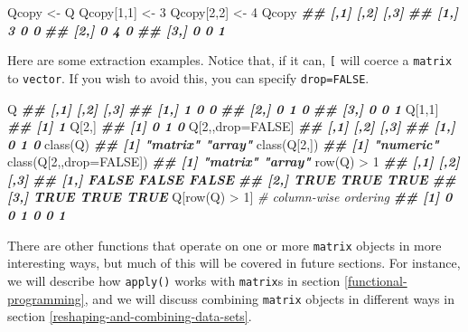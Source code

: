 \documentclass[
  12pt,
  krantz2]{krantz}
\makeatletter
\newenvironment{Shaded}{\begin{snugshade}}{\end{snugshade}}
\newcommand{\AttributeTok}[1]{\textcolor[rgb]{0.61,0.61,0.61}{#1}}
\newcommand{\CommentTok}[1]{\textcolor[rgb]{0.37,0.37,0.37}{\textit{#1}}}
\newcommand{\ConstantTok}[1]{\textcolor[rgb]{0,0,0}{#1}}
\newcommand{\DecValTok}[1]{\textcolor[rgb]{0.06,0.06,0.06}{#1}}
\newcommand{\DocumentationTok}[1]{\textcolor[rgb]{0.37,0.37,0.37}{\textbf{\textit{#1}}}}
\newcommand{\FunctionTok}[1]{\textcolor[rgb]{0,0,0}{#1}}
\newcommand{\NormalTok}[1]{#1}
\newcommand{\OtherTok}[1]{\textcolor[rgb]{0.37,0.37,0.37}{#1}}
\newcommand{\SpecialCharTok}[1]{\textcolor[rgb]{0,0,0}{#1}}
\newenvironment{kframe}{%
\medskip{}
\setlength{\fboxsep}{.8em}
 \def\at@end@of@kframe{}%
 \ifinner\ifhmode%
  \def\at@end@of@kframe{\end{minipage}}%
  \begin{minipage}{\columnwidth}%
 \fi\fi%
 \def\FrameCommand##1{\hskip\@totalleftmargin \hskip-\fboxsep
 \colorbox{shadecolor}{##1}\hskip-\fboxsep
     \hskip-\linewidth \hskip-\@totalleftmargin \hskip\columnwidth}%
 \MakeFramed {\advance\hsize-\width
   \@totalleftmargin\z@ \linewidth\hsize
   \@setminipage}}%
 {\par\unskip\endMakeFramed%
 \at@end@of@kframe}
\renewenvironment{Shaded}{\begin{kframe}}{\end{kframe}}
\makeatother
\begin{document}
\begin{Shaded}
\begin{Highlighting}[]
\NormalTok{Qcopy }\OtherTok{\textless{}{-}}\NormalTok{ Q}
\NormalTok{Qcopy[}\DecValTok{1}\NormalTok{,}\DecValTok{1}\NormalTok{] }\OtherTok{\textless{}{-}} \DecValTok{3}
\NormalTok{Qcopy[}\DecValTok{2}\NormalTok{,}\DecValTok{2}\NormalTok{] }\OtherTok{\textless{}{-}} \DecValTok{4}
\NormalTok{Qcopy}
\DocumentationTok{\#\#      [,1] [,2] [,3]}
\DocumentationTok{\#\# [1,]    3    0    0}
\DocumentationTok{\#\# [2,]    0    4    0}
\DocumentationTok{\#\# [3,]    0    0    1}
\end{Highlighting}
\end{Shaded}

Here are some extraction examples. Notice that, if it can, \texttt{{[}} will coerce a \texttt{matrix} to \texttt{vector}. If you wish to avoid this, you can specify \texttt{drop=FALSE}.

\begin{Shaded}
\begin{Highlighting}[]
\NormalTok{Q}
\DocumentationTok{\#\#      [,1] [,2] [,3]}
\DocumentationTok{\#\# [1,]    1    0    0}
\DocumentationTok{\#\# [2,]    0    1    0}
\DocumentationTok{\#\# [3,]    0    0    1}
\NormalTok{Q[}\DecValTok{1}\NormalTok{,}\DecValTok{1}\NormalTok{]}
\DocumentationTok{\#\# [1] 1}
\NormalTok{Q[}\DecValTok{2}\NormalTok{,]}
\DocumentationTok{\#\# [1] 0 1 0}
\NormalTok{Q[}\DecValTok{2}\NormalTok{,,drop}\OtherTok{=}\ConstantTok{FALSE}\NormalTok{]}
\DocumentationTok{\#\#      [,1] [,2] [,3]}
\DocumentationTok{\#\# [1,]    0    1    0}
\FunctionTok{class}\NormalTok{(Q)}
\DocumentationTok{\#\# [1] "matrix" "array"}
\FunctionTok{class}\NormalTok{(Q[}\DecValTok{2}\NormalTok{,])}
\DocumentationTok{\#\# [1] "numeric"}
\FunctionTok{class}\NormalTok{(Q[}\DecValTok{2}\NormalTok{,,}\AttributeTok{drop=}\ConstantTok{FALSE}\NormalTok{])  }
\DocumentationTok{\#\# [1] "matrix" "array"}
\FunctionTok{row}\NormalTok{(Q) }\SpecialCharTok{\textgreater{}} \DecValTok{1}
\DocumentationTok{\#\#       [,1]  [,2]  [,3]}
\DocumentationTok{\#\# [1,] FALSE FALSE FALSE}
\DocumentationTok{\#\# [2,]  TRUE  TRUE  TRUE}
\DocumentationTok{\#\# [3,]  TRUE  TRUE  TRUE}
\NormalTok{Q[}\FunctionTok{row}\NormalTok{(Q) }\SpecialCharTok{\textgreater{}} \DecValTok{1}\NormalTok{] }\CommentTok{\# column{-}wise ordering}
\DocumentationTok{\#\# [1] 0 0 1 0 0 1}
\end{Highlighting}
\end{Shaded}

There are other functions that operate on one or more \texttt{matrix} objects in more interesting ways, but much of this will be covered in future sections. For instance, we will describe how \texttt{apply()} works with \texttt{matrix}s in section \ref{functional-programming}, and we will discuss combining \texttt{matrix} objects in different ways in section \ref{reshaping-and-combining-data-sets}.
\end{document}
